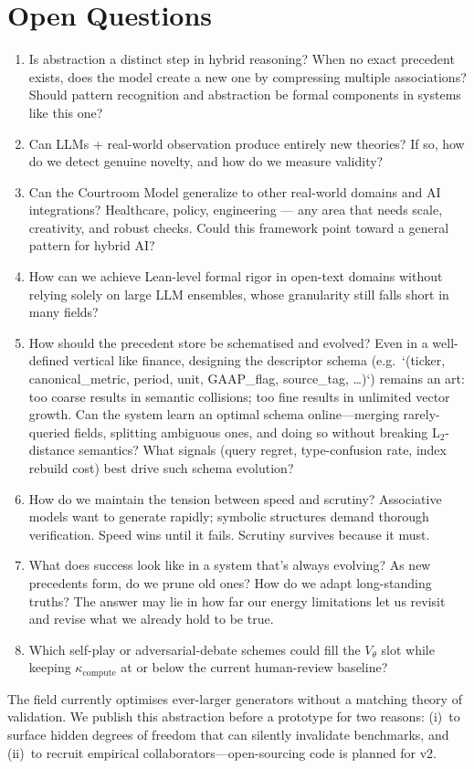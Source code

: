 \documentclass[11pt]{article}
\begin{document}
\section{Open Questions}
\label{sec:open-questions}
\begin{enumerate}
    \item Is abstraction a distinct step in hybrid reasoning? When no exact precedent exists, does the model create a new one by compressing multiple associations? Should pattern recognition and abstraction be formal components in systems like this one?
    \item Can LLMs + real-world observation produce entirely new theories? If so, how do we detect genuine novelty, and how do we measure validity?
    \item Can the Courtroom Model generalize to other real-world domains and AI integrations? Healthcare, policy, engineering — any area that needs scale, creativity, and robust checks. Could this framework point toward a general pattern for hybrid AI?
    \item How can we achieve Lean-level formal rigor in open-text domains without relying solely on large LLM ensembles, whose granularity still falls short in many fields?
    \item \label{open-question-schema} How should the precedent store be schematised and evolved? Even in a well-defined vertical like finance, designing the descriptor schema (e.g.\ `(ticker, canonical\_metric, period, unit, GAAP\_flag, source\_tag, …)`) remains an art: too coarse results in semantic collisions; too fine results in unlimited vector growth. Can the system learn an optimal schema online—merging rarely-queried fields, splitting ambiguous ones, and doing so without breaking L$_2$-distance semantics? What signals (query regret, type-confusion rate, index rebuild cost) best drive such schema evolution?
    \item How do we maintain the tension between speed and scrutiny? Associative models want to generate rapidly; symbolic structures demand thorough verification. Speed wins until it fails. Scrutiny survives because it must.
    \item What does success look like in a system that's always evolving? As new precedents form, do we prune old ones? How do we adapt long-standing truths? The answer may lie in how far our energy limitations let us revisit and revise what we already hold to be true.
    \item Which self-play or adversarial-debate schemes could fill the \(V_\theta\) slot while keeping \(\kappa_{\text{compute}}\) at or below the current human-review baseline?
\end{enumerate}
\begin{tcolorbox}[colback=gray!5,colframe=gray!40,title=Why a concept note?]
  The field currently optimises ever-larger generators without a matching theory of
  validation.  We publish this abstraction before a prototype for two reasons:
  (i)~to surface hidden degrees of freedom that can silently invalidate benchmarks,
  and (ii)~to recruit empirical collaborators—open-sourcing code is planned for v2.
\end{tcolorbox}
\end{document}
